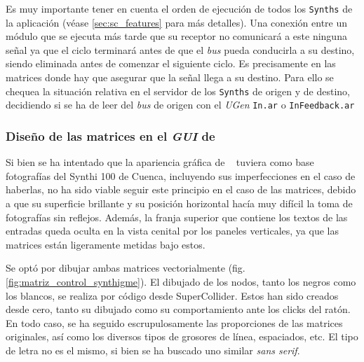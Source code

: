 Es muy importante tener en cuenta el orden de ejecución de todos los \texttt{Synths} de la aplicación (véase \ref{sec:sc_features} para más detalles). Una conexión entre un módulo que se ejecuta más tarde que su receptor no comunicará a este ninguna señal ya que el ciclo terminará antes de que el \textit{bus} pueda conducirla a su destino, siendo eliminada antes de comenzar el siguiente ciclo. Es precisamente en las matrices donde hay que asegurar que la señal llega a su destino. Para ello se chequea la situación relativa en el servidor de los \texttt{Synths} de origen y de destino, decidiendo si se ha de leer del \textit{bus} de origen con el \textit{UGen} \texttt{In.ar} o \texttt{InFeedback.ar}


\subsubsection[Diseño de las matrices en el \textit{GUI} de  \appName]{Diseño de las matrices en el \textit{GUI} de  \appName}
Si bien se ha intentado que la apariencia gráfica de \appName~ tuviera como base fotografías del Synthi 100 de Cuenca, incluyendo sus imperfecciones en el caso de haberlas, no ha sido viable seguir este principio en el caso de las matrices, debido a que su superficie brillante y su posición horizontal hacía muy difícil la toma de fotografías sin reflejos. Además, la franja superior que contiene los textos de las entradas queda oculta en la vista cenital por los paneles verticales, ya que las matrices están ligeramente metidas bajo estos.

Se optó por dibujar ambas matrices vectorialmente (fig. \ref{fig:matriz_control_synthigme}). El dibujado de los nodos, tanto los negros como los blancos, se realiza por código desde SuperCollider. Estos han sido creados desde cero, tanto su dibujado como su comportamiento ante los clicks del ratón. En todo caso, se ha seguido escrupulosamente las proporciones de las matrices originales, así como los diversos tipos de grosores de línea, espaciados, etc.  El tipo de letra no es el mismo, si bien se ha buscado uno similar \textit{sans serif}.

